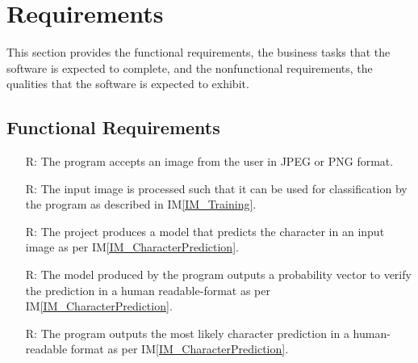 \documentclass[12pt]{article}
\newcounter{reqnum} %
\begin{document}

\section{Requirements}


This section provides the functional requirements, the business tasks that the
software is expected to complete, and the nonfunctional requirements, the
qualities that the software is expected to exhibit.

\subsection{Functional Requirements}

\noindent \begin{itemize}

\item[R\refstepcounter{reqnum}\thereqnum \label{R_Inputs}:] The program accepts
an image from the user in JPEG or PNG format.


\item[R\refstepcounter{reqnum}\thereqnum \label{R_OutputInputs}:] The input
image is processed such that it can be used for classification by the program as
described in IM\ref{IM_Training}.


\item[R\refstepcounter{reqnum}\thereqnum \label{R_Calculate}:] The \progname{}
project produces a model that predicts the character in an input image as per
IM\ref{IM_CharacterPrediction}.



\item[R\refstepcounter{reqnum}\thereqnum \label{R_VerifyOutput}:] The model
produced by the program outputs a probability vector to verify the prediction in
a human readable-format as per IM\ref{IM_CharacterPrediction}.


\item[R\refstepcounter{reqnum}\thereqnum \label{R_Output}:] The program outputs
the most likely character prediction in a human-readable format as per
IM\ref{IM_CharacterPrediction}.


\end{itemize}
\end{document}
